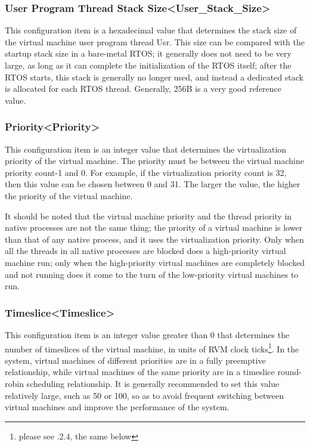 \subsubsection{User Program Thread Stack Size<User\_Stack\_Size>{}}\label{subsubsec:5-3-15-2}

This configuration item is a hexadecimal value that determines the stack size of the virtual machine user program thread Usr. This size can be compared with the startup stack size in a bare-metal RTOS; it generally does not need to be very large, as long as it can complete the initialization of the RTOS itself; after the RTOS starts, this stack is generally no longer used, and instead a dedicated stack is allocated for each RTOS thread. Generally, 256B is a very good reference value.

\subsubsection{Priority<Priority>{}}\label{subsubsec:5-3-15-3}

This configuration item is an integer value that determines the virtualization priority of the virtual machine. The priority must be between the virtual machine priority count-1 and 0. For example, if the virtualization priority count is 32, then this value can be chosen between 0 and 31. The larger the value, the higher the priority of the virtual machine.

It should be noted that the virtual machine priority and the thread priority in native processes are not the same thing; the priority of a virtual machine is lower than that of any native process, and it uses the virtualization priority. Only when all the threads in all native processes are blocked does a high-priority virtual machine run; only when the high-priority virtual machines are completely blocked and not running does it come to the turn of the low-priority virtual machines to run.

\subsubsection{Timeslice<Timeslice>{}}\label{subsubsec:5-3-15-4}

This configuration item is an integer value greater than 0 that determines the number of timeslices of the virtual machine, in units of RVM clock ticks\footnote{please see .2.4, the same below}. In the system, virtual machines of different priorities are in a fully preemptive relationship, while virtual machines of the same priority are in a timeslice round-robin scheduling relationship. It is generally recommended to set this value relatively large, such as 50 or 100, so as to avoid frequent switching between virtual machines and improve the performance of the system.

